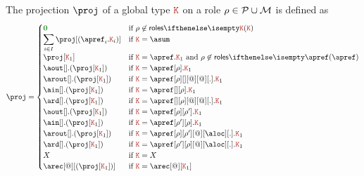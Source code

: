 The projection $\proj$ of a global type $\aK$ on a role
$\rho \in \mathcal{P} \cup \mathcal{M}$ is defined as
\[
  \proj =
  \begin{cases}
    \nil & \text{if } \arole \not \in \roles \aK
    \\
    \displaystyle{\sum_{i\in I}{\proj[(\apref_i.\aK_i)]}}
    &
    \text{if } \aK = \asum
    \\
    \proj[\aK_1]
    &
    \text{if } \aK = \apref.\aK_1 \text{ and } \rho\not\in\roles{\apref}
    \\
    \aout[].(\proj[\aK_1])
    &
    \text{if } \aK = \apref[\arole].\aK_1
    \\
    \arout[].(\proj[\aK_1])
    &
    \text{if } \aK = \apref[\arole][{}][@][@][.].\aK_1
    \\
    \ain[].(\proj[\aK_1])
    &
    \text{if } \aK = \apref[{}][\arole].\aK_1
    \\
    \ard[].(\proj[\aK_1])
    &
    \text{if }  \aK = \apref[{}][\arole][@][@][.].\aK_1
    \\
    \aout[].(\proj[\aK_1])
    &
    \text{if } \aK = \apref[\arole][\arole'].\aK_1
    \\
    \ain[].(\proj[\aK_1])
    &
    \text{if } \aK = \apref[\arole'][\arole].\aK_1
    \\
    \arout[].(\proj[\aK_1])
    &
    \text{if } \aK = \apref[\arole][\arole'][@][\aloc][.].\aK_1
    \\
    \ard[].(\proj[\aK_1])
    &
    \text{if } \aK = \apref[\arole'][\arole][@][\aloc][.].\aK_1
    \\
    X
    & \text{if } \aK = X
    \\
    \arec[@][{(\proj[\aK_1])}]
    &
    \text{if } \aK = \arec[@][\aK_1]
  \end{cases}
\]


